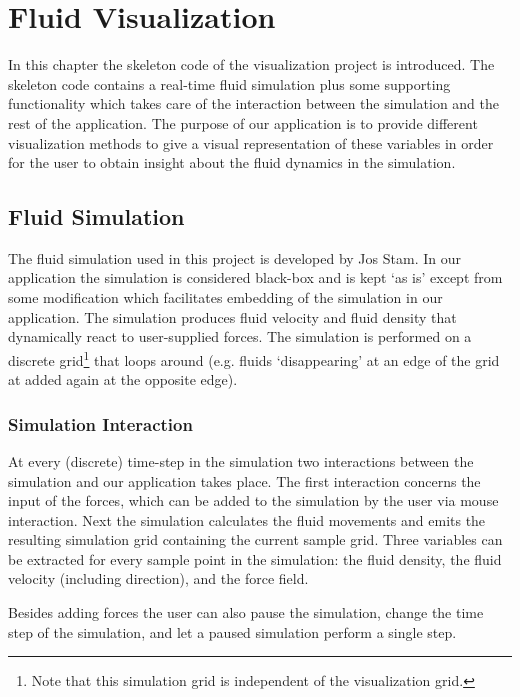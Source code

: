 
\chapter{Fluid Visualization} %
\label{cha:skeleton_compilation}
In this chapter the skeleton code of the visualization project is introduced. The skeleton code contains a real-time fluid simulation plus some supporting functionality which takes care of the interaction between the simulation and the rest of the application. The purpose of our application is to provide different visualization methods to give a visual representation of these variables in order for the user to obtain insight about the fluid dynamics in the simulation. 

\section{Fluid Simulation} %
\label{sec:fluid_simulation}
The fluid simulation used in this project is developed by Jos Stam\cite{Simulation:Stam:2002}. In our application the simulation is considered black-box and is kept `as is' except from some modification which facilitates embedding of the simulation in our application. The simulation produces fluid velocity and fluid density that dynamically react to user-supplied forces. The simulation is performed on a discrete grid\footnote{Note that this simulation grid is independent of the visualization grid.} that loops around (e.g. fluids `disappearing' at an edge of the grid at added again at the opposite edge).

\subsection{Simulation Interaction} %
\label{sub:simulation_interaction}
At every (discrete) time-step in the simulation two interactions between the simulation and our application takes place. The first interaction concerns the input of the forces, which can be added to the simulation by the user via mouse interaction. Next the simulation calculates the fluid movements and emits the resulting simulation grid containing the current sample grid. Three variables can be extracted for every sample point in the simulation: the fluid density, the fluid velocity (including direction), and the force field.

Besides adding forces the user can also pause the simulation, change the time step of the simulation, and let a paused simulation perform a single step.


